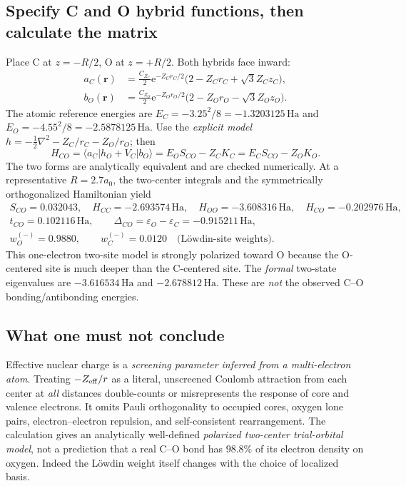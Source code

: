 \documentclass[11pt,letterpaper]{article}
\newcommand{\mel}[3]{\langle #1\lvert #2\rvert #3\rangle}
\newcommand{\ha}{\,\mathrm{Ha}}
\newcommand{\e}{\mathrm e}
\begin{document}
\subsection{Specify C and O hybrid functions, then calculate the matrix}
Place C at $z=-R/2$, O at $z=+R/2$. Both hybrids face inward:
\begin{align}\label{eq:cohybrid}
a_C(\mathbf r)&=\frac{C_{Z_C}}{2}\e^{-Z_Cr_C/2}\big(2-Z_Cr_C+\sqrt3Z_Cz_C\big),\\
b_O(\mathbf r)&=\frac{C_{Z_O}}{2}\e^{-Z_Or_O/2}\big(2-Z_Or_O-\sqrt3Z_Oz_O\big).\nonumber
\end{align}
The atomic reference energies are $E_C=-3.25^2/8=-1.3203125\ha$ and $E_O=-4.55^2/8=-2.5878125\ha$. Use the \emph{explicit model} $h=-\frac12\nabla^2-Z_C/r_C-Z_O/r_O$; then
\begin{equation}\label{eq:cohab}
\boxed{H_{CO}=\mel{a_C}{h_O+V_C}{b_O}=E_OS_{CO}-Z_CK_C
=E_CS_{CO}-Z_OK_O.}
\end{equation}
The two forms are analytically equivalent and are checked numerically. At a representative $R=2.7a_0$, the two-center integrals and the symmetrically orthogonalized Hamiltonian yield
\begin{equation}\label{eq:co-values}
\begin{gathered}
S_{CO}=0.032043,\quad H_{CC}=-2.693574\ha,\quad H_{OO}=-3.608316\ha,\quad H_{CO}=-0.202976\ha,\\
t_{CO}=0.102116\ha,\qquad \Delta_{CO}=\varepsilon_O-\varepsilon_C=-0.915211\ha,\\
\boxed{w_O^{(-)}=0.9880,\qquad w_C^{(-)}=0.0120\quad\text{(L\"owdin-site weights)}.}
\end{gathered}
\end{equation}
This one-electron two-site model is strongly polarized toward O because the O-centered site is much deeper than the C-centered site. The \emph{formal} two-state eigenvalues are $-3.616534\ha$ and $-2.678812\ha$. These are \emph{not} the observed C--O bonding/antibonding energies.

\subsection{What one must not conclude}
Effective nuclear charge is a \emph{screening parameter inferred from a multi-electron atom}. Treating $-Z_{\rm eff}/r$ as a literal, unscreened Coulomb attraction from each center at \emph{all} distances double-counts or misrepresents the response of core and valence electrons. It omits Pauli orthogonality to occupied cores, oxygen lone pairs, electron--electron repulsion, and self-consistent rearrangement. The calculation gives an analytically well-defined \emph{polarized two-center trial-orbital model}, not a prediction that a real C--O bond has $98.8\%$ of its electron density on oxygen. Indeed the L\"owdin weight itself changes with the choice of localized basis.
\end{document}
